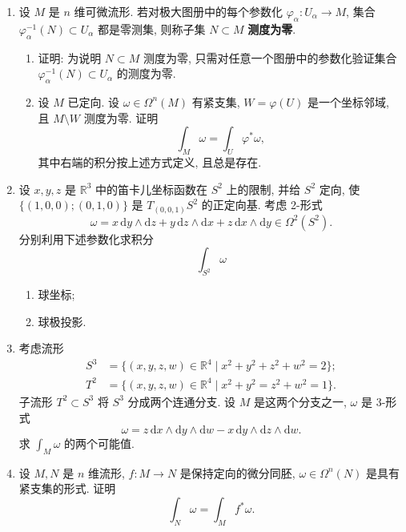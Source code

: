 \begin{RiemannExercise}\label{ex:integration-on-manifolds}
\begin{enumerate}[label=(\arabic*),ref=\arabic*,leftmargin=*]
\item\label{ex:zero-measure-on-manifold} 设 $M$ 是 $n$ 维可微流形. 若对极大图册中的每个参数化 $\varphi_\alpha:U_\alpha\to M$, 集合 $\varphi_\alpha^{-1}(N)\subset U_\alpha$ 都是零测集, 则称子集 $N\subset M$ \textbf{测度为零}.
\begin{enumerate}[label=(\alph*),leftmargin=*]
\item 证明: 为说明 $N\subset M$ 测度为零, 只需对任意一个图册中的参数化验证集合 $\varphi_\alpha^{-1}(N)\subset U_\alpha$ 的测度为零.
\item 设 $M$ 已定向. 设 $\omega\in\Omega^n(M)$ 有紧支集, $W=\varphi(U)$ 是一个坐标邻域, 且 $M\setminus W$ 测度为零. 证明
\[
  \int_M\omega=\int_U\varphi^*\omega,
\]
其中右端的积分按上述方式定义, 且总是存在.
\end{enumerate}
\item\label{ex:sphere-integral-by-two-charts} 设 $x,y,z$ 是 $\mathbb{R}^3$ 中的笛卡儿坐标函数在 $S^2$ 上的限制, 并给 $S^2$ 定向, 使 $\{(1,0,0);(0,1,0)\}$ 是 $T_{(0,0,1)}S^2$ 的正定向基. 考虑 2-形式
\[
  \omega=x\,\mathrm{d}y\wedge\mathrm{d}z+y\,\mathrm{d}z\wedge\mathrm{d}x
  +z\,\mathrm{d}x\wedge\mathrm{d}y\in\Omega^2(S^2).
\]
分别利用下述参数化求积分
\[
  \int_{S^2}\omega
\]
\begin{enumerate}[label=(\alph*),leftmargin=*]
\item 球坐标;
\item 球极投影.
\end{enumerate}
\item\label{ex:integral-on-complement-of-torus-in-sphere} 考虑流形
\begin{align*}
  S^3&=\{(x,y,z,w)\in\mathbb{R}^4\mid x^2+y^2+z^2+w^2=2\};\\
  T^2&=\{(x,y,z,w)\in\mathbb{R}^4\mid x^2+y^2=z^2+w^2=1\}.
\end{align*}
子流形 $T^2\subset S^3$ 将 $S^3$ 分成两个连通分支. 设 $M$ 是这两个分支之一, $\omega$ 是 3-形式
\[
  \omega=z\,\mathrm{d}x\wedge\mathrm{d}y\wedge\mathrm{d}w
  -x\,\mathrm{d}y\wedge\mathrm{d}z\wedge\mathrm{d}w.
\]
求 $\int_M\omega$ 的两个可能值.
\item\label{ex:orientation-preserving-pullback-integral} 设 $M,N$ 是 $n$ 维流形, $f:M\to N$ 是保持定向的微分同胚, $\omega\in\Omega^n(N)$ 是具有紧支集的形式. 证明
\[
  \int_N\omega=\int_Mf^*\omega.
\]
\end{enumerate}
\end{RiemannExercise}
